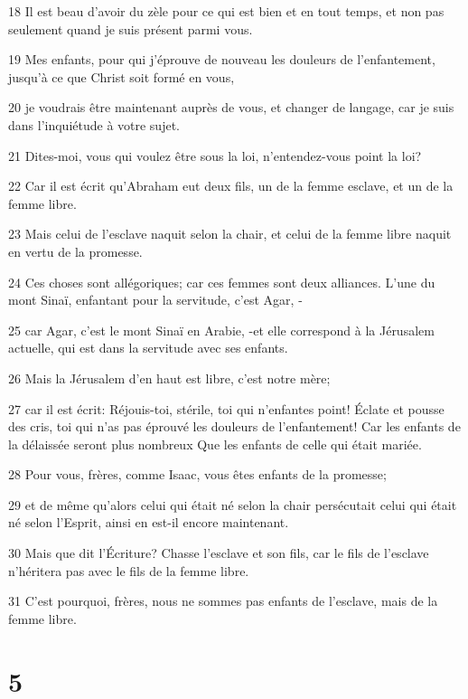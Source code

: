 \par 18 Il est beau d'avoir du zèle pour ce qui est bien et en tout temps, et non pas seulement quand je suis présent parmi vous.
\par 19 Mes enfants, pour qui j'éprouve de nouveau les douleurs de l'enfantement, jusqu'à ce que Christ soit formé en vous,
\par 20 je voudrais être maintenant auprès de vous, et changer de langage, car je suis dans l'inquiétude à votre sujet.
\par 21 Dites-moi, vous qui voulez être sous la loi, n'entendez-vous point la loi?
\par 22 Car il est écrit qu'Abraham eut deux fils, un de la femme esclave, et un de la femme libre.
\par 23 Mais celui de l'esclave naquit selon la chair, et celui de la femme libre naquit en vertu de la promesse.
\par 24 Ces choses sont allégoriques; car ces femmes sont deux alliances. L'une du mont Sinaï, enfantant pour la servitude, c'est Agar, -
\par 25 car Agar, c'est le mont Sinaï en Arabie, -et elle correspond à la Jérusalem actuelle, qui est dans la servitude avec ses enfants.
\par 26 Mais la Jérusalem d'en haut est libre, c'est notre mère;
\par 27 car il est écrit: Réjouis-toi, stérile, toi qui n'enfantes point! Éclate et pousse des cris, toi qui n'as pas éprouvé les douleurs de l'enfantement! Car les enfants de la délaissée seront plus nombreux Que les enfants de celle qui était mariée.
\par 28 Pour vous, frères, comme Isaac, vous êtes enfants de la promesse;
\par 29 et de même qu'alors celui qui était né selon la chair persécutait celui qui était né selon l'Esprit, ainsi en est-il encore maintenant.
\par 30 Mais que dit l'Écriture? Chasse l'esclave et son fils, car le fils de l'esclave n'héritera pas avec le fils de la femme libre.
\par 31 C'est pourquoi, frères, nous ne sommes pas enfants de l'esclave, mais de la femme libre.

\chapter{5}

